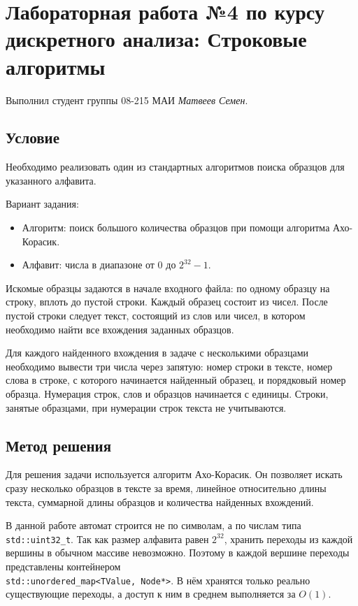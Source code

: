 \documentclass[12pt]{article}
\begin{document}
\section*{Лабораторная работа №4 по курсу дискретного анализа: Строковые алгоритмы}

Выполнил студент группы 08-215 МАИ \textit{Матвеев Семен}.

\subsection*{Условие}
\hspace{2ex}
Необходимо реализовать один из стандартных алгоритмов поиска образцов для указанного алфавита.

Вариант задания:
\begin{itemize}
    \item Алгоритм: поиск большого количества образцов при помощи алгоритма Ахо-Корасик.
    \item Алфавит: числа в диапазоне от $0$ до $2^{32} - 1$.
\end{itemize}

Искомые образцы задаются в начале входного файла: по одному образцу на строку, вплоть до пустой строки. Каждый образец состоит из чисел. После пустой строки следует текст, состоящий из слов или чисел, в котором необходимо найти все вхождения заданных образцов.

Для каждого найденного вхождения в задаче с несколькими образцами необходимо вывести три числа через запятую: номер строки в тексте, номер слова в строке, с которого начинается найденный образец, и порядковый номер образца. Нумерация строк, слов и образцов начинается с единицы. Строки, занятые образцами, при нумерации строк текста не учитываются.

\subsection*{Метод решения}
\hspace{2ex}
Для решения задачи используется алгоритм Ахо-Корасик. Он позволяет искать сразу несколько образцов в тексте за время, линейное относительно длины текста, суммарной длины образцов и количества найденных вхождений.

В данной работе автомат строится не по символам, а по числам типа \texttt{std::uint32\_t}. Так как размер алфавита равен $2^{32}$, хранить переходы из каждой вершины в обычном массиве невозможно. Поэтому в каждой вершине переходы представлены контейнером\\ \texttt{std::unordered\_map<TValue, Node*>}. В нём хранятся только реально существующие переходы, а доступ к ним в среднем выполняется за $O(1)$.
\end{document}
